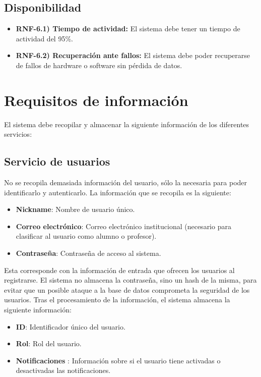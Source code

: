 \subsection{Disponibilidad}

\begin{itemize}
    \item \textbf{RNF-6.1) Tiempo de actividad:} El sistema debe tener un tiempo de actividad del 95\%.
    \item \textbf{RNF-6.2) Recuperación ante fallos:} El sistema debe poder recuperarse de fallos de hardware o software sin pérdida de datos.
\end{itemize}

\section{Requisitos de información}

El sistema debe recopilar y almacenar la siguiente información de los diferentes servicios:

\subsection{Servicio de usuarios}
No se recopila demasiada información del usuario, sólo la necesaria para poder identificarlo y autenticarlo. La información que se recopila es la siguiente:

\begin{itemize}
    \item \textbf{Nickname}: Nombre de usuario único.
    \item \textbf{Correo electrónico}: Correo electrónico institucional (necesario para clasificar al usuario como alumno o profesor).
    \item \textbf{Contraseña}: Contraseña de acceso al sistema.
\end{itemize}

Esta corresponde con la información de entrada que ofrecen los usuarios al registrarse. El sistema no almacena la contraseña, sino un hash de la misma, para evitar que un posible ataque a la base de datos comprometa la seguridad de los usuarios.
Tras el procesamiento de la información, el sistema almacena la siguiente información:

\begin{itemize}
    \item \textbf{ID}: Identificador único del usuario.
    \item \textbf{Rol}: Rol del usuario.
    \item \textbf{Notificaciones} : Información sobre si el usuario tiene activadas o desactivadas las notificaciones.
\end{itemize}

